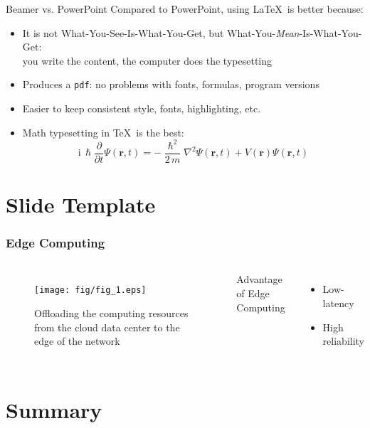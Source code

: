 \documentclass{beamer}
\begin{document}
\begin{frame}{Beamer vs. PowerPoint}
	Compared to PowerPoint, using \LaTeX\ is better because:
	\begin{itemize}
		\item It is not What-You-See-Is-What-You-Get, but
		What-You-\emph{Mean}-Is-What-You-Get:\\
		you write the content, the computer does the typesetting
		\item Produces a \texttt{pdf}: no problems with fonts, formulas,
      program versions
		\item Easier to keep consistent style, fonts, highlighting, etc.
		\item Math typesetting in \TeX\ is the best:
			\begin{equation*}
				\mathrm{i}\,\hslash\frac{\partial}{\partial t} \Psi(\mathbf{r},t) =
				-\frac{\hslash^2}{2\,m}\nabla^2\Psi(\mathbf{r},t)
				+ V(\mathbf{r})\Psi(\mathbf{r},t)
			\end{equation*}
		\end{itemize}
\end{frame}

\section{Slide Template}


\begin{frame}
\frametitle{Edge Computing}
\begin{columns}

\begin{figure}
\centering
  \texttt{[image: fig/fig\_1.eps]}
  \caption{Offloading the computing resources from the cloud data center to the edge of the network\footnotemark}
\end{figure}
Advantage of Edge Computing
\begin{itemize}
	\item Low-latency
	\item High reliability
\end{itemize}

\end{columns}
\end{frame}


\section{Summary}
\end{document}
